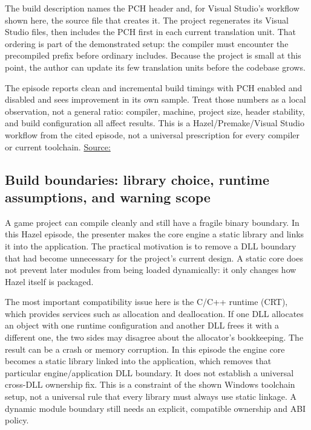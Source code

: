 The build description names the PCH header and, for Visual Studio's workflow shown here, the source file that creates it. The project regenerates its Visual Studio files, then includes the PCH first in each current  translation unit. That ordering is part of the demonstrated setup: the compiler must encounter the precompiled prefix before ordinary includes. Because the project is small at this point, the author can update its few translation units before the codebase grows.

The episode reports clean and incremental build timings with PCH enabled and disabled and sees improvement in its own sample. Treat those numbers as a local observation, not a general ratio: compiler, machine, project size, header stability, and build configuration all affect results. This is a Hazel/Premake/Visual Studio workflow from the cited episode, not a universal prescription for every compiler or current toolchain. \href{https://www.youtube.com/watch?v=UQ718BrbQ5E}{Source:}

\subsection{Build boundaries: library choice, runtime assumptions, and warning scope}\label{05-engine-i-ch013-build-boundaries-library-choice-runtime-assumptions-and-warning-scope}

\hypertarget{05-engine-i-ch013-build-boundaries-library-choice-runtime-assumptions-and-warning-scope}{}

A game project can compile cleanly and still have a fragile binary boundary. In this Hazel episode, the presenter makes the core engine a static library and links it into the application. The practical motivation is to remove a DLL boundary that had become unnecessary for the project's current design. A static core does not prevent later modules from being loaded dynamically: it only changes how Hazel itself is packaged.

The most important compatibility issue here is the C/C++ runtime (CRT), which provides services such as allocation and deallocation. If one DLL allocates an object with one runtime configuration and another DLL frees it with a different one, the two sides may disagree about the allocator's bookkeeping. The result can be a crash or memory corruption. In this episode the engine core becomes a static library linked into the application, which removes that particular engine/application DLL boundary. It does not establish a universal cross-DLL ownership fix. This is a constraint of the shown Windows toolchain setup, not a universal rule that every library must always use static linkage. A dynamic module boundary still needs an explicit, compatible ownership and ABI policy.

